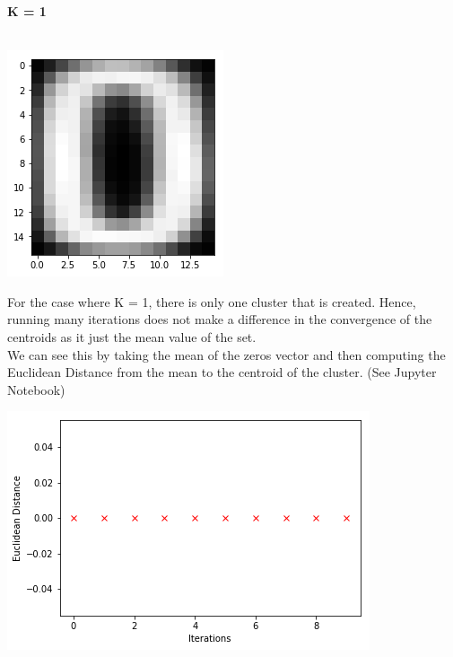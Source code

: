 \documentclass[a4paper]{article}
\begin{document}
{
{\textbf{\large K = 1}} \\ \\

\begin{center}
\includegraphics[scale=1.0]{./k1.png}  \\
\end{center}

For the case where K = 1, there is only one cluster that is created. Hence, running many iterations does not make a difference in the convergence of the centroids as it just the mean value of the set. \\ 
We can see this by taking the mean of the zeros vector and then computing the Euclidean Distance from the mean to the centroid of the cluster. (See Jupyter Notebook)\\
\begin{center}
 \includegraphics[scale=.80]{./k1plt.png} \\
\end{center} 

}
\end{document}
